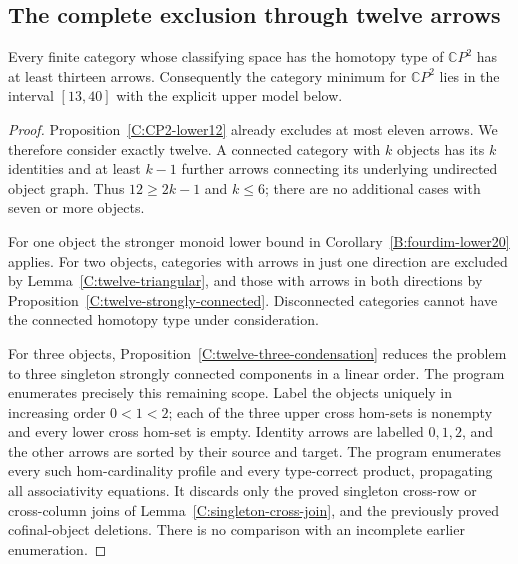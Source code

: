 \subsection{The complete exclusion through twelve arrows}

\begin{theorem}\label{C:CP2-lower13}
Every finite category whose classifying space has the homotopy
type of $\mathbb CP^2$ has at least thirteen arrows.
Consequently the category minimum for $\mathbb CP^2$ lies in
the interval $[13,40]$ with the explicit upper model below.
\end{theorem}
\begin{proof}
Proposition~\ref{C:CP2-lower12} already excludes at most eleven
arrows. We therefore consider exactly twelve. A connected
category with $k$ objects has its $k$ identities and at least
$k-1$ further arrows connecting its underlying undirected
object graph. Thus $12\geq2k-1$ and $k\leq6$; there are no
additional cases with seven or more objects.

For one object the stronger monoid lower bound in
Corollary~\ref{B:fourdim-lower20} applies.
For two objects, categories with arrows in just one direction
are excluded by Lemma~\ref{C:twelve-triangular}, and those
with arrows in both directions by
Proposition~\ref{C:twelve-strongly-connected}.
Disconnected categories cannot have the connected homotopy
type under consideration.

For three objects,
Proposition~\ref{C:twelve-three-condensation} reduces the
problem to three singleton strongly connected components in
a linear order. The program
 enumerates precisely
this remaining scope. Label the objects uniquely in increasing
order $0<1<2$; each of the three upper cross hom-sets is
nonempty and every lower cross hom-set is empty. Identity
arrows are labelled $0,1,2$, and the other arrows are sorted
by their source and target. The program enumerates every
such hom-cardinality profile and every type-correct product,
propagating all associativity equations. It discards only the
proved singleton cross-row or cross-column joins of
Lemma~\ref{C:singleton-cross-join}, and the previously proved
cofinal-object deletions. There is no comparison with an
incomplete earlier enumeration.


\end{proof}

